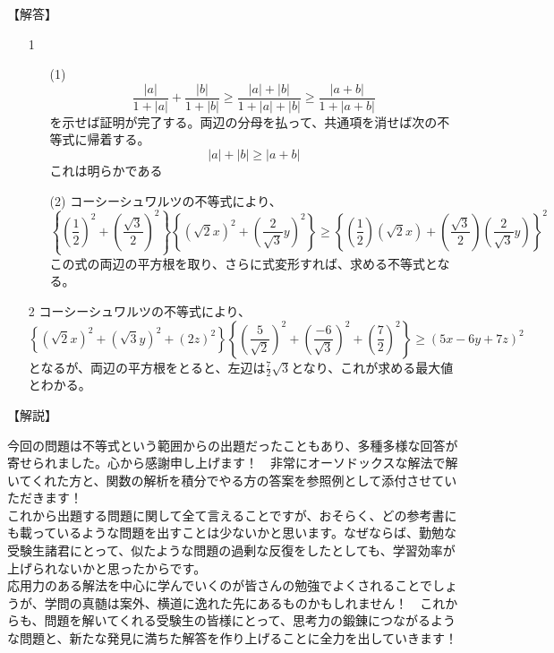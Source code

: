 \documentclass[a4paper,fleqn,dvipdfmx]{jsarticle}
\begin{document}
\begin{flushleft}
【解答】
\end{flushleft}

\begin{itemize}
    \item [1] 
        \begin{itemize}
            \item [(1)] $$\frac{|a|}{1+|a|}+\frac{|b|}{1+|b|} \geq \frac{|a|+|b|}{1+|a|+|b|}\geq \frac{|a+b|}{1+|a+b|}$$を示せば証明が完了する。両辺の分母を払って、共通項を消せば次の不等式に帰着する。
            $$|a|+|b|\geq |a+b|$$
            これは明らかである
            \item [(2)] 
            コーシーシュワルツの不等式により、
            $$\left\{\left(\frac{1}{2}\right)^2+\left(\frac{\sqrt{3}}{2}\right)^2\right\}
            \left\{(\sqrt{2}x)^2+\left(\frac{2}{\sqrt{3}}y\right)^2\right\}\geq
            \left\{\left(\frac{1}{2}\right)(\sqrt{2}x)+\left(\frac{\sqrt{3}}{2}\right)\left(\frac{2}{\sqrt{3}}y\right)\right\}^2$$
            この式の両辺の平方根を取り、さらに式変形すれば、求める不等式となる。
        \end{itemize}
    \item [2]
    コーシーシュワルツの不等式により、
    $$\left\{\left(\sqrt{2}x\right)^2+\left(\sqrt{3}y\right)^2+(2z)^2\right\}
    \left\{\left(\frac{5}{\sqrt{2}}\right)^2+\left(\frac{-6}{\sqrt{3}}\right)^2+\left(\frac{7}{2}\right)^2\right\}\geq
    (5x-6y+7z)^2$$
    となるが、両辺の平方根をとると、左辺は$\frac{7}{2}\sqrt{3}$となり、これが求める最大値とわかる。
\end{itemize}

\begin{flushleft}
【解説】
\end{flushleft}

今回の問題は不等式という範囲からの出題だったこともあり、多種多様な回答が寄せられました。心から感謝申し上げます！　非常にオーソドックスな解法で解いてくれた方と、関数の解析を積分でやる方の答案を参照例として添付させていただきます！\\
これから出題する問題に関して全て言えることですが、おそらく、どの参考書にも載っているような問題を出すことは少ないかと思います。なぜならば、勤勉な受験生諸君にとって、似たような問題の過剰な反復をしたとしても、学習効率が上げられないかと思ったからです。\\
応用力のある解法を中心に学んでいくのが皆さんの勉強でよくされることでしょうが、学問の真髄は案外、横道に逸れた先にあるものかもしれません！　これからも、問題を解いてくれる受験生の皆様にとって、思考力の鍛錬につながるような問題と、新たな発見に満ちた解答を作り上げることに全力を出していきます！
\end{document}
